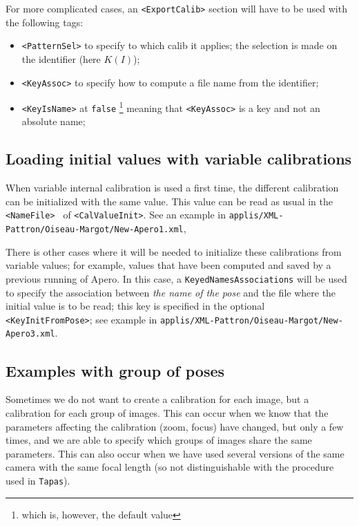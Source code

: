 For more complicated cases,  an {\tt <ExportCalib>} section  will have to be
used with the following tags:

\begin{itemize}
    \item {\tt <PatternSel>}  to specify to which calib it applies; the selection
         is made on the identifier (here $K(I)$);

    \item {\tt <KeyAssoc>}  to specify how to compute a file name from the identifier;

    \item {\tt <KeyIsName>}  at {\tt false} \footnote{which is, however, the default value} meaning
          that {\tt <KeyAssoc>}  is a key and not an absolute name;
\end{itemize}


\subsection{Loading initial values  with  variable calibrations}

When  variable internal calibration is used a first time,
the different calibration can be initialized with the same
value.  This value can be read as usual in the {\tt <NameFile> } of {\tt <CalValueInit>}.
See an example in {\tt  applis/XML-Pattron/Oiseau-Margot/New-Apero1.xml},

There is other cases where it will be needed to initialize these  calibrations
from variable values; for example, values  that have been computed and saved by a
previous running of Apero. In this case, a {\tt KeyedNamesAssociations} will be used
to specify the association between \emph{the  name of the pose} and the file where
the initial value is to be read; this key is specified in the optional
{\tt <KeyInitFromPose>}; see example in {\tt  applis/XML-Pattron/Oiseau-Margot/New-Apero3.xml}.



\subsection{Examples with group of poses}

Sometimes we do not want to create a calibration for each image,
but a calibration for each group of images. This can occur
when we know that the parameters affecting the calibration
(zoom, focus) have changed, but only a few times, and we are able
to specify which groups of images share the same parameters.
This can also occur when we have used several versions of the
same camera with the same focal length (so not distinguishable
with the procedure used in {\tt Tapas}).


